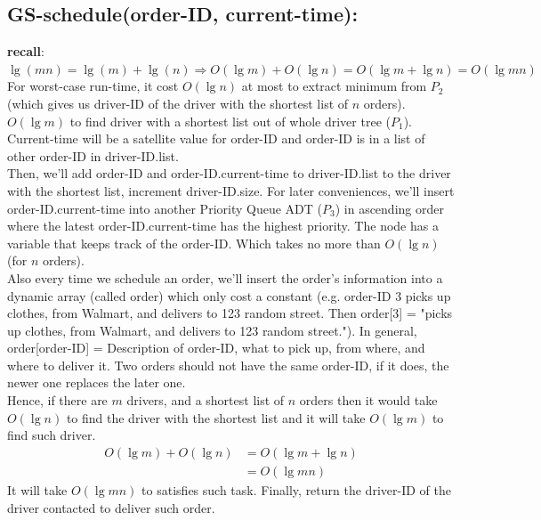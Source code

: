 \documentclass{article}
\begin{document}
\subsection*{GS-schedule(order-ID, current-time):} 
\textbf{recall}: $\lg (mn) = \lg (m) + \lg (n) \Rightarrow O(\lg m) + O(\lg n) = O(\lg m + \lg n) = O(\lg mn) $\\
For worst-case run-time, it cost $O(\lg n)$ at most to extract minimum from $P_2$ (which gives us driver-ID of the driver with the shortest list of $n$ orders). \\
$O(\lg m)$ to find driver with a shortest list out of whole driver tree ($P_1$).
Current-time will be a satellite value for order-ID and order-ID is in a list of other order-ID in driver-ID.list. \\
Then, we'll add order-ID and order-ID.current-time to driver-ID.list to the driver with the shortest list, increment driver-ID.size.
For later conveniences, we'll insert order-ID.current-time into another Priority Queue ADT ($P_3$) in ascending order where the latest order-ID.current-time has the highest priority. The node has a variable that keeps track of the order-ID. Which takes no more than $O(\lg n)$ (for $n$ orders). \\
Also every time we schedule an order, we'll insert the order's information into a dynamic array (called order) which only cost a constant (e.g. order-ID 3 picks up clothes, from Walmart, and delivers to 123 random street. Then order[3] = "picks up clothes, from Walmart, and delivers to 123 random street."). In general, order[order-ID] = Description of order-ID, what to pick up, from where, and where to deliver it. Two orders should not have the same order-ID, if it does, the newer one replaces the later one.\\
Hence, if there are $m$ drivers, and a shortest list of $n$ orders then it would take $O(\lg n)$ to find the driver with the shortest list and it will take $O(\lg m)$ to find such driver.
\begin{align*}
    O(\lg m) + O(\lg n) &= O(\lg m + \lg n) \\
    &= O(\lg mn) 
\end{align*}
It will take $O(\lg mn)$ to satisfies such task. Finally, return the driver-ID of the driver contacted to deliver such order.
\end{document}
